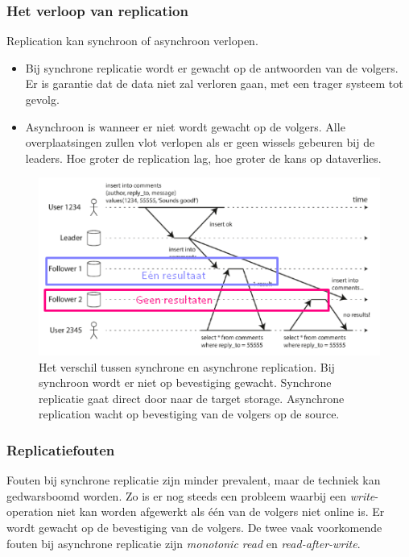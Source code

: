 \documentclass[a4paper,10pt,twoside]{report}
\begin{document}
\subsubsection{Het verloop van replication}

Replication kan synchroon of asynchroon verlopen. 
\begin{itemize}
	\item Bij synchrone replicatie wordt er gewacht op de antwoorden van de volgers. Er is garantie dat de data niet zal verloren gaan, met een trager systeem tot gevolg.
	\item Asynchroon is wanneer er niet wordt gewacht op de volgers. Alle overplaatsingen zullen vlot verlopen als er geen wissels gebeuren bij de leaders. Hoe groter de replication lag, hoe groter de kans op dataverlies.
\end{itemize}

 
\begin{figure}
 	\includegraphics[width=\linewidth]{../images/Screenshot_213.png}
 	\caption{Het verschil tussen synchrone en asynchrone replication. Bij synchroon wordt er niet op bevestiging gewacht. Synchrone replicatie gaat direct door naar de target storage. Asynchrone replication wacht op bevestiging van de volgers op de source.}
\end{figure}

\subsubsection{Replicatiefouten}

Fouten bij synchrone replicatie zijn minder prevalent, maar de techniek kan gedwarsboomd worden. Zo is er nog steeds een probleem waarbij een \textit{write}-operation niet kan worden afgewerkt als één van de volgers niet online is. Er wordt gewacht op de bevestiging van de volgers. De twee vaak voorkomende fouten bij asynchrone replicatie zijn \textit{monotonic read} en \textit{read-after-write}. 
\end{document}
